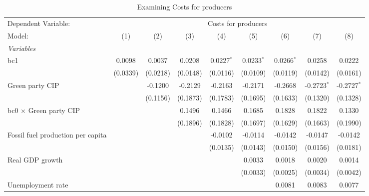 
\begin{table}[htbp]
   \caption{Examining Costs for producers}
   \centering
   \begin{tabular}{lcccccccc}
      \tabularnewline \midrule \midrule
      Dependent Variable: & \multicolumn{8}{c}{Costs for producers}\\
      Model:                                  & (1)      & (2)      & (3)      & (4)          & (5)          & (6)          & (7)           & (8)\\  
      \midrule
      \emph{Variables}\\
      bc1                                     & 0.0098   & 0.0037   & 0.0208   & 0.0227$^{*}$ & 0.0233$^{*}$ & 0.0266$^{*}$ & 0.0258        & 0.0222\\   
                                              & (0.0339) & (0.0218) & (0.0148) & (0.0116)     & (0.0109)     & (0.0119)     & (0.0142)      & (0.0161)\\   
      Green party CIP                         &          & -0.1200  & -0.2129  & -0.2163      & -0.2171      & -0.2668      & -0.2723$^{*}$ & -0.2727$^{*}$\\   
                                              &          & (0.1156) & (0.1873) & (0.1783)     & (0.1695)     & (0.1633)     & (0.1320)      & (0.1328)\\   
      bc0 $\times$ Green party CIP            &          &          & 0.1496   & 0.1466       & 0.1685       & 0.1828       & 0.1822        & 0.1330\\   
                                              &          &          & (0.1896) & (0.1828)     & (0.1697)     & (0.1629)     & (0.1663)      & (0.1990)\\   
      Fossil fuel production per capita       &          &          &          & -0.0102      & -0.0114      & -0.0142      & -0.0147       & -0.0142\\   
                                              &          &          &          & (0.0135)     & (0.0143)     & (0.0150)     & (0.0156)      & (0.0181)\\   
      Real GDP growth                         &          &          &          &              & 0.0033       & 0.0018       & 0.0020        & 0.0014\\   
                                              &          &          &          &              & (0.0033)     & (0.0025)     & (0.0034)      & (0.0042)\\   
      Unemployment rate                       &          &          &          &              &              & 0.0081       & 0.0083        & 0.0077\\   

\end{tabular}
\end{table}
